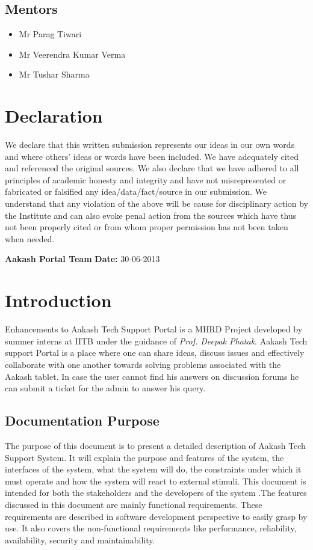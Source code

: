 \documentclass[letterpaper,10pt,english]{sphinxmanual}
\begin{document}
\section{Mentors}
\label{unifieddoc:mentors}\begin{itemize}
\item {} 
Mr Parag Tiwari

\item {} 
Mr Veerendra Kumar Verma

\item {} 
Mr Tushar Sharma

\end{itemize}


\chapter{Declaration}
\label{unifieddoc:declaration}
We declare that this written submission represents our ideas in our own words and where others' ideas or words have been included. We have adequately cited and referenced the original sources. We also declare that we have adhered to all principles of academic honesty and integrity and have not misrepresented or fabricated or falsified any idea/data/fact/source in our submission. We understand that any violation of the above will be cause for disciplinary action by the Institute and can also evoke penal action from the sources which have thus not been properly cited or from whom proper permission has not been taken when needed.

\textbf{Aakash Portal Team}
\textbf{Date:} 30-06-2013


\chapter{Introduction}
\label{unifieddoc:introduction}
Enhancements to Aakash Tech Support Portal is a MHRD Project developed by summer interns at IITB under the guidance of \emph{Prof. Deepak Phatak}. Aakash Tech support Portal is a place where one can share ideas, discuss issues and effectively collaborate with one another towards solving problems associated with the Aakash tablet.
In case the user cannot find his answers on discussion forums he can submit a ticket for the admin to answer his query.


\section{Documentation Purpose}
\label{unifieddoc:documentation-purpose}
The purpose of this document is to present a detailed description of Aakash Tech Support System. It will explain the purpose and features of the system, the interfaces of the system, what the system will do, the constraints under which it must operate and how the system will react to external stimuli. This document is intended for both the stakeholders and the developers of the system .The features discussed in this document are mainly functional requirements. These requirements are described in software development perspective to easily grasp by use. It also covers the non-functional requirements like performance, reliability, availability, security and maintainability.
\end{document}
